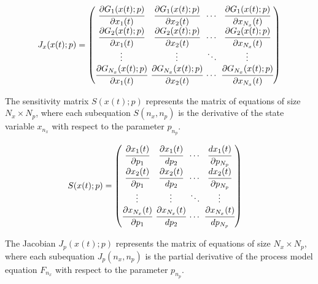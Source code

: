 \documentclass[../Article_Sensitivity_Analsysis.tex]{subfiles}
\begin{document}
	{\footnotesize
		\begin{align}
			\begingroup %
			\setlength\arraycolsep{2pt}
			{J_x}(x(t);p)=\begin{pmatrix}
				\cfrac{\partial {G_{1}}(x(t);p)}{\partial {x_{1}}(t)} & \cfrac{\partial {G_{1}}(x(t);p)}{\partial {x_{2}}(t)} & \cdots & \cfrac{\partial {G_{1}}(x(t);p)}{\partial {x_{N_x}}(t)}\\
				\cfrac{\partial {G_{2}}(x(t);p)}{\partial {x_{1}}(t)} & \cfrac{\partial {G_{2}}(x(t);p)}{\partial {x_{2}}(t)} & \cdots & \cfrac{\partial {G_{2}}(x(t);p)}{\partial {x_{N_x}}(t)}\\
				\vdots & \vdots & \ddots & \vdots\\ 
				\cfrac{\partial {G_{N_x}}(x(t);p)}{\partial {x_{1}}(t)} & \cfrac{\partial {G_{N_x}}(x(t);p)}{\partial {x_{2}}(t)} & \cdots & \cfrac{\partial {G_{N_x}}(x(t);p)}{\partial {x_{N_x}}(t)}\\
			\end{pmatrix}
			\endgroup
	\end{align} }
	
	The sensitivity matrix $S(x(t);p)$ represents the matrix of equations of size $N_x \times N_p$, where each subequation $S(n_x,n_p)$ is the derivative of the state variable $x_{n_x}$ with respect to the parameter $p_{n_p}$.
	
	{\footnotesize
		\begin{equation}
			\begin{split}
				S(x(t);p) & = 
				\begingroup %
				\setlength\arraycolsep{2pt}
				\begin{pmatrix}
					\cfrac{\partial {x_{1}}(t)}{\partial {p_{1}}} 	& \cfrac{\partial {x_{1}}(t)}{d {p_{2}}}     & \cdots & \cfrac{d {x_{1}}(t)}{\partial {p_{N_p}}}\\
					\cfrac{\partial {x_{2}}(t)}{\partial {p_{1}}} 	& \cfrac{\partial {x_{2}}(t)}{d {p_{2}}}     & \cdots & \cfrac{d {x_{2}}(t)}{\partial {p_{N_p}}}\\
					\vdots					 	    & \vdots 					   	  & \ddots & \vdots\\
					\cfrac{\partial {x_{N_x}}(t)}{\partial {p_{1}}} 	& \cfrac{\partial {x_{N_x}}(t)}{d {p_{2}}}     & \cdots & \cfrac{\partial {x_{N_x}}(t)}{d {p_{N_p}}}
				\end{pmatrix} 
				\endgroup
			\end{split}
	\end{equation} }
	
	The Jacobian ${J_p}(x(t);p)$ represents the matrix of equations of size $N_x \times N_p$, where each subequation ${J_p}(n_x,n_p)$ is the partial derivative of the process model equation $F_{n_x}$ with respect to the parameter $p_{n_p}$.
	
\end{document}
